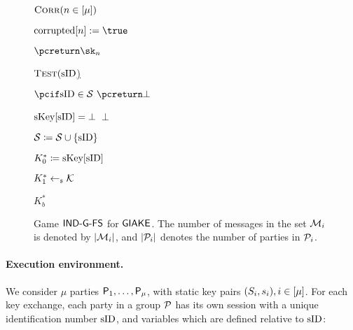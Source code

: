 \begin{figure}[h!]
{{\begin{minipage}[t]{7cm}
				\underline{$\CorruptO(n \in [\mu])$}
				\begin{nicodemus}
					\item $\corrupted[n] := \true$
					\item $\pcreturn \sk_n$\\
				\end{nicodemus}
				
				\underline{$\TestO(\sID$)}
				\begin{nicodemus}
					\item $\pcif \sid\in\testSessions~ \pcreturn \bot$ 
					\item \pcif $\skeys[\sID] = \bot$~\pcreturn $\bot$
					\item $\testSessions \coloneqq \testSessions \cup \{\sid\}$
					\item $K_0^* \coloneqq \skeys[\sID]$
					\item $K_1^* \getsr \mathcal{K}$
					\item \pcreturn $K_b^*$
				\end{nicodemus}
			\end{minipage}
	}}
	\caption{
	Game $\GIAKEsecurityPFSGame$ for $\GIAKE$.
	The number of messages in the set $\GakeIniMesSet[\GakeUId]$ is denoted by $|\GakeIniMesSet[\GakeUId]|$, and 
	$|\peers_\GakeUId|$ denotes the number of parties in $\peers_\GakeUId$.
	\label{fig:game-ind-atk-gake}}
\end{figure}


\paragraph{Execution environment.} We consider $\mu$ parties $\User[1], \ldots, \User[\mu]$, with static key pairs $(\spk_i, \ssk_i), i \in [\mu]$. 
For each key exchange, each party in a group $\PartySet$ has its own session with a unique identification number $\sID$, and variables which are defined relative to $\sID$:


